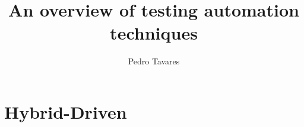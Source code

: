 \documentclass[11pt,a4paper]{article}
\title{An overview of testing automation techniques}
\author{Pedro Tavares}
\begin{document}
\begin{titlingpage}
\maketitle
\end{titlingpage}

\newpage
\tableofcontents
\newpage

\newpage

\newpage


\section{Hybrid-Driven}
\newpage
\newpage

\newpage


\newpage


\end{document}
